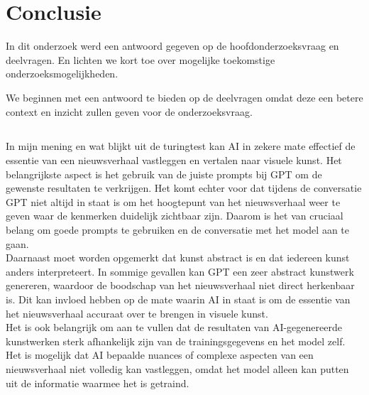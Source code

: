 
\chapter{Conclusie}%
\label{ch:conclusie}
In dit onderzoek werd een antwoord gegeven op de hoofdonderzoeksvraag en deelvragen. En lichten we kort toe over mogelijke toekomstige onderzoeksmogelijkheden. 

We beginnen met een antwoord te bieden op de deelvragen omdat deze een betere context en inzicht zullen geven voor de onderzoeksvraag. 

\section{}%

In mijn mening en wat blijkt uit de turingtest kan AI in zekere mate effectief de essentie van een nieuwsverhaal vastleggen en vertalen naar visuele kunst. Het belangrijkste aspect is het gebruik van de juiste prompts bij GPT om de gewenste resultaten te verkrijgen. Het komt echter voor dat tijdens de conversatie GPT niet altijd in staat is om het hoogtepunt van het nieuwsverhaal weer te geven waar de kenmerken duidelijk zichtbaar zijn. Daarom is het van cruciaal belang om goede prompts te gebruiken en de conversatie met het model aan te gaan. \\

Daarnaast moet worden opgemerkt dat kunst abstract is en dat iedereen kunst anders interpreteert. In sommige gevallen kan GPT een zeer abstract kunstwerk genereren, waardoor de boodschap van het nieuwsverhaal niet direct herkenbaar is. Dit kan invloed hebben op de mate waarin AI in staat is om de essentie van het nieuwsverhaal accuraat over te brengen in visuele kunst. \\

Het is ook belangrijk om aan te vullen dat de resultaten van AI-gegenereerde kunstwerken sterk afhankelijk zijn van de trainingsgegevens en het model zelf. Het is mogelijk dat AI bepaalde nuances of complexe aspecten van een nieuwsverhaal niet volledig kan vastleggen, omdat het model alleen kan putten uit de informatie waarmee het is getraind. \\

